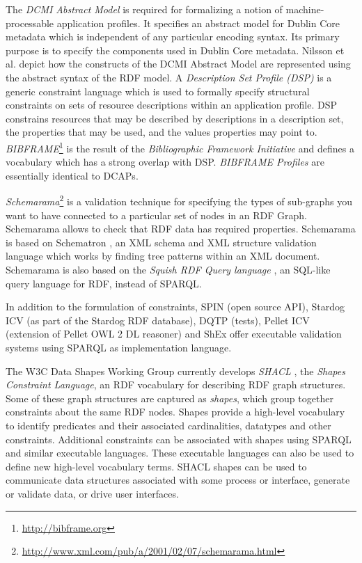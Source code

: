 \documentclass[a4paper,fontsize=11pt]{scrartcl}
\begin{document}
The \emph{DCMI Abstract Model} \cite{DCMI-Abstract-Model-2007} is required for formalizing a notion of machine-processable application profiles. It specifies an abstract model for Dublin Core metadata which is independent of any particular encoding syntax. Its primary purpose is to specify the components used in Dublin Core metadata. Nilsson et al. \cite{DCMI-DC-RDF-2008} depict how the constructs of the DCMI Abstract Model are represented using the abstract syntax of the RDF model. A \emph{Description Set Profile (DSP)} \cite{DCMI-DSP-2008} is a generic constraint language which is used to formally specify structural constraints on sets of resource descriptions within an application profile. DSP constrains resources that may be described by descriptions in a description set, the properties that may be used, and the values properties may point to. \emph{BIBFRAME}\footnote{\url{http://bibframe.org}} \cite{Kroeger-2013,Godby-2015,Miller-2012} is the result of the \emph{Bibliographic Framework Initiative} and defines a vocabulary \cite{DCMI-Bibframe-Authorities-2014,DCMI-Bibframe-Relationships-2014} which has a strong overlap with DSP. \emph{BIBFRAME Profiles} \cite{DCMI-Bibframe-Profiles-2014} are essentially identical to DCAPs.

\emph{Schemarama}\footnote{\url{http://www.xml.com/pub/a/2001/02/07/schemarama.html}} is a validation technique for specifying the types of sub-graphs you want to have connected to a particular set of nodes in an RDF Graph. Schemarama allows to check that RDF data has required properties. Schemarama is based on Schematron \cite{ISO/IEC-2006}, an XML schema and XML structure validation language which works by finding tree patterns within an XML document. Schemarama is also based on the \emph{Squish RDF Query language} \cite{Miller-2001}, an SQL-like query language for RDF, instead of SPARQL. 

%
%

In addition to the formulation of constraints, SPIN (open source API), Stardog ICV (as part of the Stardog RDF database), DQTP (tests), Pellet ICV (extension of Pellet OWL 2 DL reasoner) and ShEx offer executable validation systems using SPARQL as implementation language.

The W3C Data Shapes Working Group currently develops \emph{SHACL} \cite{W3C-SHACL-2015,W3C-SHACL-2-2015,W3C-SHACL-3-2015}, the \emph{Shapes Constraint Language}, an RDF vocabulary for describing RDF graph structures. Some of these graph structures are captured as \emph{shapes}, which group together constraints about the same RDF nodes. Shapes provide a high-level vocabulary to identify predicates and their associated cardinalities, datatypes and other constraints. Additional constraints can be associated with shapes using SPARQL and similar executable languages. These executable languages can also be used to define new high-level vocabulary terms. SHACL shapes can be used to communicate data structures associated with some process or interface, generate or validate data, or drive user interfaces. 
\end{document}
